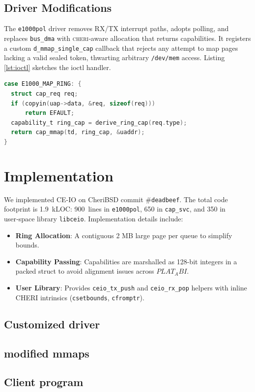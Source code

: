 \documentclass[sigconf]{acmart}
\newcommand{\cheri}{\textsc{cheri}\xspace}
\begin{document}
\subsection{Driver Modifications}
The \texttt{e1000pol} driver removes RX/TX interrupt paths, adopts polling, and replaces \texttt{bus\_dma} with \cheri‑aware allocation that returns capabilities. It registers a custom \texttt{d\_mmap\_single\_cap} callback that rejects any attempt to map pages lacking a valid sealed token, thwarting arbitrary \texttt{/dev/mem} access. Listing\,\ref{lst:ioctl} sketches the ioctl handler.

\begin{lstlisting}[language=C,caption={Capability‑aware ioctl in \texttt{e1000pol}.},label={lst:ioctl}]
case E1000_MAP_RING: {
  struct cap_req req;
  if (copyin(uap->data, &req, sizeof(req)))
      return EFAULT;
  capability_t ring_cap = derive_ring_cap(req.type);
  return cap_mmap(td, ring_cap, &uaddr);
}
\end{lstlisting}

\section{Implementation}
\label{sec:impl}
We implemented CE-IO on CheriBSD commit \#\texttt{deadbeef}. The total code footprint is 1.9 kLOC: 900 lines in \texttt{e1000pol}, 650 in \texttt{cap\_svc}, and 350 in user‑space library \texttt{libceio}. Implementation details include:
\begin{itemize}
    \item \textbf{Ring Allocation}: A contiguous 2 MB large page per queue to simplify bounds.
    \item \textbf{Capability Passing}: Capabilities are marshalled as 128-bit integers in a packed struct to avoid alignment issues across $PLAT_ABI$.
    \item \textbf{User Library}: Provides \texttt{ceio\_tx\_push} and \texttt{ceio\_rx\_pop} helpers with inline CHERI intrinsics (\texttt{csetbounds}, \texttt{cfromptr}).
\end{itemize}
\subsection{Customized driver}
\subsection{modified mmaps}

\subsection{Client program}
\end{document}
